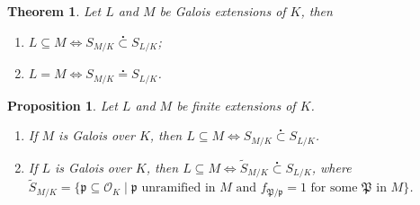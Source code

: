 \documentclass[11pt]{article}
\theoremstyle{definition}
\theoremstyle{plain}
\newtheorem{theorem}[definition]{Theorem}
\newtheorem{proposition}[definition]{Proposition}
\theoremstyle{remark}
\newcommand{\cO}{\mathcal{O}}
\newcommand{\cp}{\mathfrak{P}}
\newcommand{\fp}{\mathfrak{p}}
\newcommand{\subsetdot}{\stackrel{\centerdot}{\subset}}
\newcommand{\eqdot}{\stackrel{\centerdot}{=}}
\begin{document}
\begin{theorem}\label{thm:8_17}
    Let $L$ and $M$ be Galois extensions of $K$, then
    \begin{enumerate}
        \item $L \subseteq M \iff S_{M/K} \subsetdot S_{L/K}$;
        \item $L = M \iff S_{M/K} \eqdot S_{L/K}$.
    \end{enumerate}
\end{theorem}

\begin{proposition}\label{prop:8_18}
    Let $L$ and $M$ be finite extensions of $K$.
    \begin{enumerate}[label=\roman*)]
        \item If $M$ is Galois over $K$, then $L \subseteq M \iff S_{M/K} \subsetdot S_{L/K}$.
        \item If $L$ is Galois over $K$, then $L \subseteq M \iff \widetilde{S}_{M/K} \subsetdot S_{L/K}$, where $\widetilde{S}_{M/K} = \{\fp \subseteq \cO_K \mid \fp \text{ unramified in } M \text{ and } f_{\cp / \fp} = 1 \text{ for some } \cp \text{ in } M\}$.
    \end{enumerate}
\end{proposition}
\end{document}
